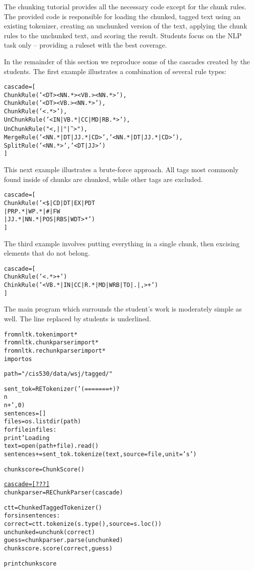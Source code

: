 \documentclass[11pt]{article}
\newenvironment{sv}{\scriptsize\begin{alltt}}{\end{alltt}\normalsize}
\begin{document}
The chunking tutorial provides all the necessary code except for the
chunk rules.  The provided code is responsible for loading the
chunked, tagged text using an existing tokenizer, creating an
unchunked version of the text, applying the chunk rules to the
unchunked text, and scoring the result.  Students focus on the
NLP task only -- providing a ruleset with the best coverage.

In the remainder of this section we reproduce some of the cascades
created by the students.  The first example illustrates a combination
of several rule types:

\begin{sv}
cascade = [
  ChunkRule('<DT><NN.*><VB.><NN.*>'),
  ChunkRule('<DT><VB.><NN.*>'),
  ChunkRule('<.*>'),
  UnChunkRule('<IN|VB.*|CC|MD|RB.*>'),
  UnChunkRule("<,|\.|``|''>"),
  MergeRule('<NN.*|DT|JJ.*|CD>', '<NN.*|DT|JJ.*|CD>'),
  SplitRule('<NN.*>', '<DT|JJ>')
]
\end{sv}

This next example illustrates a brute-force approach.  All tags most
commonly found inside of chunks are chunked, while other tags are excluded.

\begin{sv}
cascade = [
  ChunkRule('<\$|CD|DT|EX|PDT
             |PRP.*|WP.*|\#|FW
             |JJ.*|NN.*|POS|RBS|WDT>*')
]
\end{sv}

The third example involves putting everything in a single chunk,
then excising elements that do not belong.

\begin{sv}
cascade = [
  ChunkRule('<.*>+')
  ChinkRule('<VB.*|IN|CC|R.*|MD|WRB|TO|.|,>+')
]
\end{sv}

The main program which surrounds the student's work is moderately
simple as well.  The line replaced by students is underlined.

\begin{sv}
from nltk.token import *
from nltk.chunkparser import *
from nltk.rechunkparser import *
import os

path = "/cis530/data/wsj/tagged/"

sent_tok = RETokenizer('(=======+)?\\n\\n+', 0)
sentences = []
files = os.listdir(path)
for file in files:
    print 'Loading %
    text = open(path+file).read()
    sentences += sent_tok.tokenize(text, source=file, unit='s')

chunkscore = ChunkScore()

\underline{cascade = [ ??? ]}
chunkparser = REChunkParser(cascade)

ctt = ChunkedTaggedTokenizer()
for s in sentences:
    correct = ctt.tokenize(s.type(), source=s.loc())
    unchunked = unchunk(correct)
    guess = chunkparser.parse(unchunked)
    chunkscore.score(correct, guess)

print chunkscore
\end{sv}
\end{document}
